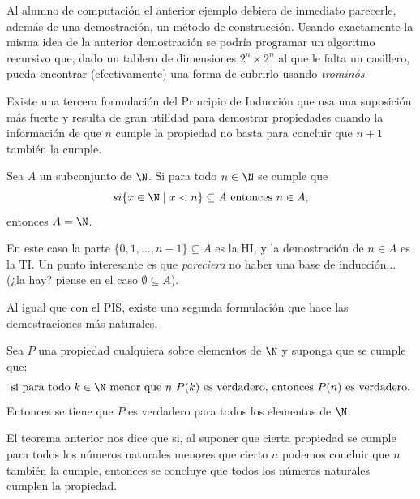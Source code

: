Al alumno de computación el anterior ejemplo debiera de inmediato parecerle, además de una demostración, un método de construcción.
Usando exactamente la misma idea de la anterior demostración se podría programar un algoritmo recursivo que, dado un tablero de dimensiones $2^n\times 2^n$ al que le falta un casillero, pueda encontrar (efectivamente) una forma de cubrirlo usando \emph{trominós}.

Existe una tercera formulación del Principio de Inducción que usa una suposición más fuerte y resulta de gran utilidad para demostrar propiedades cuando la información de que $n$ cumple la propiedad no basta para concluir que $n+1$ también la cumple.

\begin{teorema}
Sea $A$ un subconjunto de $\N$.
Si para todo $n\in\N$ se cumple que 
\[
si \{x\in \N\mid x<n\} \subseteq A \text{ entonces } n\in A,
\]
entonces $A=\N$.
\end{teorema}
En este caso la parte $\{0,1,\ldots,n-1\}\subseteq A$ es la HI, y la demostración de $n\in A$ es la TI.
Un punto interesante es que \emph{pareciera} no haber una base de inducción... (¿la hay? piense en el caso $\emptyset\subseteq A$).

Al igual que con el PIS, existe una segunda formulación que hace las demostraciones más naturales.

\begin{teorema}
Sea $P$ una propiedad cualquiera sobre elementos de $\N$ y suponga que se cumple que:
\[
\text{si para todo }k\in\N\text{ menor que }n\text{ }P(k)\text{ es verdadero, entonces }P(n)\text{ es verdadero}.
\]
Entonces se tiene que $P$ es verdadero para todos los elementos de $\N$.
\end{teorema}

El teorema anterior nos dice que si, al suponer que cierta propiedad se cumple para todos los números naturales menores que cierto $n$ podemos concluir que $n$ también la cumple, entonces se concluye que todos los números naturales cumplen la propiedad.


